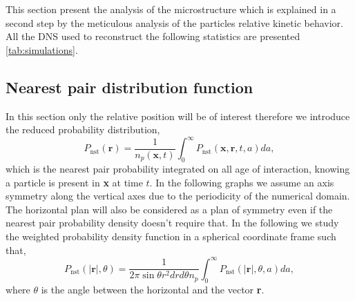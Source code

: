 This section present the analysis of the microstructure which is explained in a second step by the meticulous analysis of the particles relative kinetic behavior. 
All the DNS used to reconstruct the following statistics are presented \ref{tab:simulations}. 

\subsection{Nearest pair distribution function}
In this section only the relative position will be of interest therefore we introduce the reduced probability distribution,
\begin{equation*}
    P_\text{nst}(\textbf{r})
    =\frac{1}{n_p(\textbf{x},t)}\int_0^\infty P_\text{nst}(\textbf{x},\textbf{r},t,a) da,
\end{equation*}
which is the nearest pair probability integrated on all age of interaction, knowing a particle is present in \textbf{x} at time $t$. 
In the following graphs we assume an axis symmetry along the vertical axes due to the periodicity of the numerical domain. 
The horizontal plan will also be considered as a plan of symmetry even if the nearest pair probability density doesn't require that. 
In the following we study the weighted probability density function in a spherical coordinate frame such that, 
\begin{equation*}
    P_\text{nst}(|\textbf{r}|,\theta)
    =\frac{1}{2\pi \sin\theta r^2 dr d\theta n_p }\int_0^\infty P_\text{nst}(|\textbf{r}|,\theta,a) da,
\end{equation*}
where $\theta$ is the angle between the horizontal and the vector \textbf{r}. 

